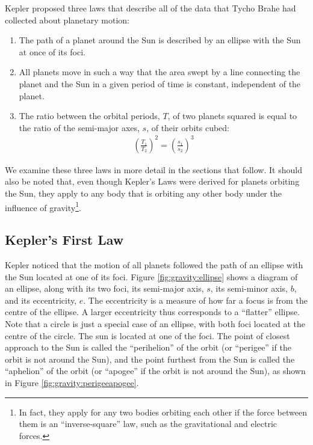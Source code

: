 Kepler proposed three laws that describe all of the data that Tycho Brahe had collected about planetary motion:
\begin{enumerate}
\item The path of a planet around the Sun is described by an ellipse with the Sun at once of its foci.
\item All planets move in such a way that the area swept by a line connecting the planet and the Sun in a given period of time is constant, independent of the planet.
\item The ratio between the orbital periods, $T$, of two planets squared is equal to the ratio of the semi-major axes, $s$, of their orbits cubed:
\begin{align*}
\left(\frac{T_1}{T_2}\right)^2=\left(\frac{s_1}{s_2}\right)^3
\end{align*}
\end{enumerate}
We examine these three laws in more detail in the sections that follow. It should also be noted that, even though Kepler's Laws were derived for planets orbiting the Sun, they apply to any body that is orbiting any other body under the influence of gravity\footnote{In fact, they apply for any two bodies orbiting each other if the force between them is an ``inverse-square'' law, such as the gravitational and electric forces.}.

\subsection{Kepler's First Law}
Kepler noticed that the motion of all planets followed the path of an ellipse with the Sun located at one of its foci. Figure \ref{fig:gravity:ellipse} shows a diagram of an ellipse, along with its two foci, its semi-major axis, $s$, its semi-minor axis, $b$, and its eccentricity, $e$. The eccentricity is a measure of how far a focus is from the centre of the ellipse. A larger eccentricity thus corresponds to a ``flatter'' ellipse. Note that a circle is just a special case of an ellipse, with both foci located at the centre of the circle.
The sun is located at one of the foci. The point of closest approach to the Sun is called the ``perihelion'' of the orbit (or ``perigee'' if the orbit is not around the Sun), and the point furthest from the Sun is called the ``aphelion'' of the orbit (or ``apogee'' if the orbit is not around the Sun), as shown in Figure \ref{fig:gravity:perigeeapogee}.


